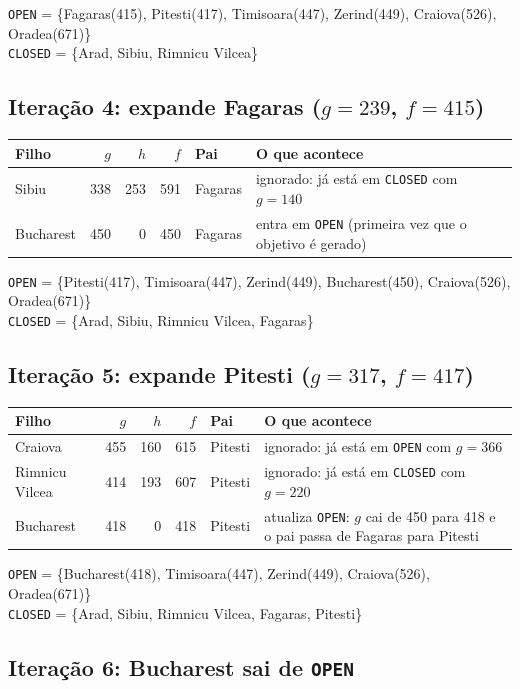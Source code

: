 \documentclass[11pt,a4paper]{article}
\begin{document}
\texttt{OPEN} = \{Fagaras(415), Pitesti(417), Timisoara(447), Zerind(449), Craiova(526), Oradea(671)\}\\
\texttt{CLOSED} = \{Arad, Sibiu, Rimnicu Vilcea\}

\subsection*{Iteração 4: expande Fagaras ($g = 239$, $f = 415$)}

\begin{tabularx}{\linewidth}{lrrrlX}
  \toprule
  Filho & $g$ & $h$ & $f$ & Pai & O que acontece \\
  \midrule
  Sibiu & 338 & 253 & 591 & Fagaras & ignorado: já está em \texttt{CLOSED} com $g = 140$ \\
  Bucharest & 450 & 0 & 450 & Fagaras & entra em \texttt{OPEN} (primeira vez que o objetivo é gerado) \\
  \bottomrule
\end{tabularx}

\texttt{OPEN} = \{Pitesti(417), Timisoara(447), Zerind(449), Bucharest(450), Craiova(526), Oradea(671)\}\\
\texttt{CLOSED} = \{Arad, Sibiu, Rimnicu Vilcea, Fagaras\}

\subsection*{Iteração 5: expande Pitesti ($g = 317$, $f = 417$)}

\begin{tabularx}{\linewidth}{lrrrlX}
  \toprule
  Filho & $g$ & $h$ & $f$ & Pai & O que acontece \\
  \midrule
  Craiova & 455 & 160 & 615 & Pitesti & ignorado: já está em \texttt{OPEN} com $g = 366$ \\
  Rimnicu Vilcea & 414 & 193 & 607 & Pitesti & ignorado: já está em \texttt{CLOSED} com $g = 220$ \\
  Bucharest & 418 & 0 & 418 & Pitesti & atualiza \texttt{OPEN}: $g$ cai de 450 para 418 e o pai passa de Fagaras para Pitesti \\
  \bottomrule
\end{tabularx}

\texttt{OPEN} = \{Bucharest(418), Timisoara(447), Zerind(449), Craiova(526), Oradea(671)\}\\
\texttt{CLOSED} = \{Arad, Sibiu, Rimnicu Vilcea, Fagaras, Pitesti\}

\subsection*{Iteração 6: Bucharest sai de \texttt{OPEN}}
\end{document}
